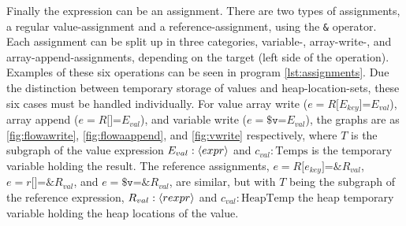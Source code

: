 Finally the expression can be an assignment. There are two types of assignments, a regular value-assignment and a reference-assignment, using the \texttt{\&} operator. Each assignment can be split up in three categories, variable-, array-write-, and array-append-assignments, depending on the target (left side of the operation). Examples of these six operations can be seen in program \ref{lst:assignments}. Due the distinction between temporary storage of values and heap-location-sets, these six cases must be handled individually. For value array write ($e = R\texttt{[$E_{key}$]=} E_{val}$), array append ($e = R\texttt{[]=} E_{val}$), and variable write ($e = \texttt{\$v=} E_{val}$), the graphs are as \ref{fig:flowawrite}, \ref{fig:flowaappend}, and \ref{fig:vwrite} respectively, where $T$ is the subgraph of the value expression $E_{val} : \langle expr\rangle$ and $c_{val} : \text{Temps}$ is the temporary variable holding the result. The reference assignments,  $e = R\texttt{[$e_{key}$]=\&} R_{val}$, $e = r\texttt{[]=\&} R_{val}$, and $e = \texttt{\$v=\&} R_{val}$, are similar, but with $T$ being the subgraph of the reference expression, $R_{val} : \langle rexpr\rangle$ and $c_{val} : \text{HeapTemp}$ the heap temporary variable holding the heap locations of the value.
